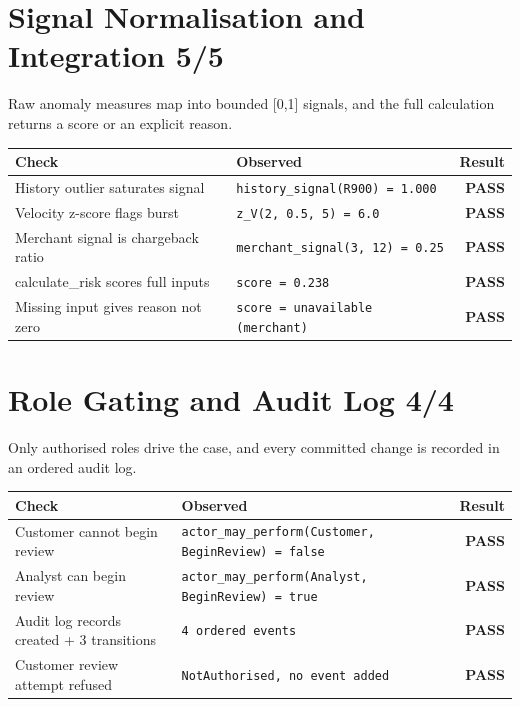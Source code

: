 \documentclass[11pt,a4paper]{article}
\newcommand{\pass}{\textcolor{PassGreen}{\textbf{PASS}}}
\begin{document}
\section*{Signal Normalisation and Integration \hfill \normalsize\textcolor{ADGBlue}{5/5}}
\noindent Raw anomaly measures map into bounded [0,1] signals, and the full calculation returns a score or an explicit reason.\par\vspace{0.4em}
\renewcommand{\arraystretch}{1.25}
\begin{longtable}{@{}p{}p{}r@{}}
\toprule
\textbf{Check} & \textbf{Observed} & \textbf{Result} \\
\midrule
\endhead
History outlier saturates signal & \texttt{\small history\_signal(R900) = 1.000} & \pass \\
Velocity z-score flags burst & \texttt{\small z\_V(2, 0.5, 5) = 6.0} & \pass \\
Merchant signal is chargeback ratio & \texttt{\small merchant\_signal(3, 12) = 0.25} & \pass \\
calculate\_risk scores full inputs & \texttt{\small score = 0.238} & \pass \\
Missing input gives reason not zero & \texttt{\small score = unavailable (merchant)} & \pass \\
\bottomrule
\end{longtable}

\section*{Role Gating and Audit Log \hfill \normalsize\textcolor{ADGBlue}{4/4}}
\noindent Only authorised roles drive the case, and every committed change is recorded in an ordered audit log.\par\vspace{0.4em}
\renewcommand{\arraystretch}{1.25}
\begin{longtable}{@{}p{}p{}r@{}}
\toprule
\textbf{Check} & \textbf{Observed} & \textbf{Result} \\
\midrule
\endhead
Customer cannot begin review & \texttt{\small actor\_may\_perform(Customer, BeginReview) = false} & \pass \\
Analyst can begin review & \texttt{\small actor\_may\_perform(Analyst, BeginReview) = true} & \pass \\
Audit log records created + 3 transitions & \texttt{\small 4 ordered events} & \pass \\
Customer review attempt refused & \texttt{\small NotAuthorised, no event added} & \pass \\
\bottomrule
\end{longtable}
\end{document}

